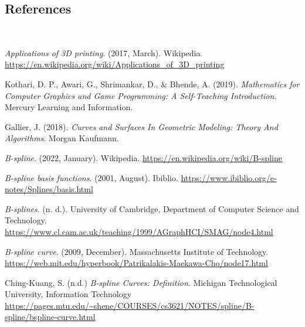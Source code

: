 \documentclass{article}
\begin{document}
\vspace{12pt}

\begin{large}
\section{References}
\end{large}

\vspace{12pt}

$\phantom{w}$

\emph{Applications of 3D printing}. (2017, March). Wikipedia. \url{https://en.wikipedia.org/wiki/Applications_of_3D_printing}

\vspace{12pt}

Kothari, D. P., Awari, G., Shrimankar, D., $\&$ Bhende, A. (2019). \emph{Mathematics for Computer Graphics and Game Programming: A Self-Teaching Introduction}. Mercury Learning and Information.

\vspace{12pt}

Gallier, J. (2018). \emph{Curves and Surfaces In Geometric Modeling: Theory And Algorithms}. Morgan Kaufmann.

\vspace{12pt}

\emph{B-spline}. (2022, January). Wikipedia. \url{https://en.wikipedia.org/wiki/B-spline}

\vspace{12pt}

\emph{B-spline basis functions}. (2001, August). Ibiblio. \url{https://www.ibiblio.org/e-notes/Splines/basis.html}

\vspace{12pt}

\emph{B-splines}. (n. d.). University of Cambridge, Department of Computer Science and Technology. \url{https://www.cl.cam.ac.uk/teaching/1999/AGraphHCI/SMAG/node4.html}

\vspace{12pt}

\emph{B-spline curve}. (2009, December). Massachusetts Institute of Technology. \url{https://web.mit.edu/hyperbook/Patrikalakis-Maekawa-Cho/node17.html}

\vspace{12pt}

Ching-Kuang, S. (n.d.) \emph{B-spline Curves: Definition}. Michigan Technological University, Information Technology \url{https://pages.mtu.edu/~shene/COURSES/cs3621/NOTES/spline/B-spline/bspline-curve.html}
\end{document}
